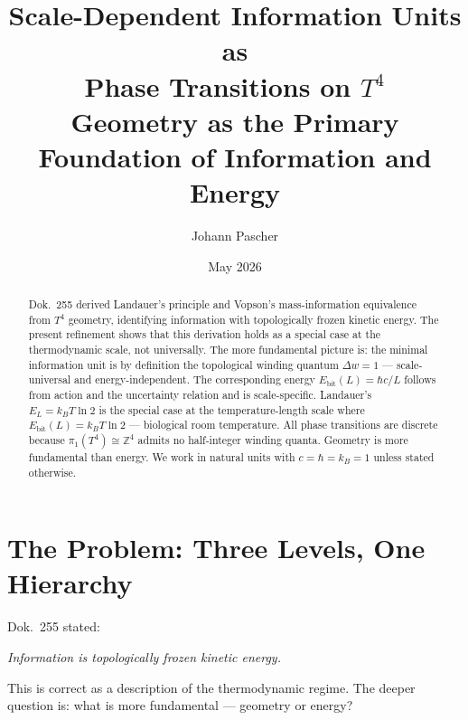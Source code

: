 
\title{Scale-Dependent Information Units as\\
Phase Transitions on \(T^4\)\\[0.4em]
\large Geometry as the Primary Foundation of Information and Energy}
\author{Johann Pascher}
\date{May 2026}
\maketitle

\begin{abstract}
Dok.~255 derived Landauer's principle and Vopson's mass-information
equivalence from \(T^4\) geometry, identifying information with
topologically frozen kinetic energy.
The present refinement shows that this derivation holds as a
special case at the thermodynamic scale, not universally.
The more fundamental picture is: the minimal information unit is
by definition the topological winding quantum \(\Delta w = 1\) —
scale-universal and energy-independent.
The corresponding energy \(E_\text{bit}(L) = \hbar c / L\)
follows from action and the uncertainty relation and is scale-specific.
Landauer's \(E_L = k_B T \ln 2\) is the special case at the
temperature-length scale where \(E_\text{bit}(L) = k_BT\ln2\) —
biological room temperature.
All phase transitions are discrete because
\(\pi_1(T^4) \cong \mathbb{Z}^4\) admits no half-integer winding quanta.
Geometry is more fundamental than energy.
We work in natural units with \(c = \hbar = k_B = 1\)
unless stated otherwise.
\end{abstract}

\tableofcontents
\newpage

\section{The Problem: Three Levels, One Hierarchy}

Dok.~255 stated:
\begin{center}
\textit{Information is topologically frozen kinetic energy.}
\end{center}

This is correct as a description of the thermodynamic regime.
The deeper question is: what is more fundamental — geometry or energy?

